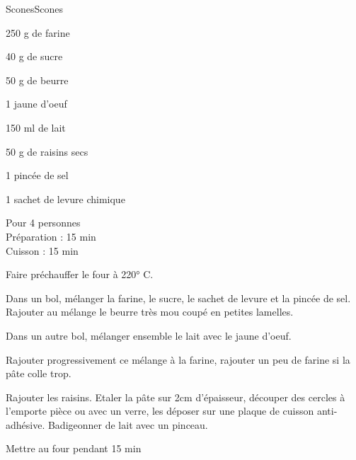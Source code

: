 \begin{recette}{Scones}{Scones}

\begin{ingredients}
250 g de farine\par
40 g de sucre\par
50 g de beurre\par
1 jaune d'oeuf\par
150 ml de lait\par
50 g de raisins secs\par
1 pincée de sel\par
1 sachet de levure chimique\par
\end{ingredients}

\begin{infos}
Pour 4 personnes\\
Préparation : 15 min\\
Cuisson : 15 min\\
\end{infos}

\begin{etapes}
\item Faire préchauffer le four à 220° C.
\item Dans un bol, mélanger la farine, le sucre, le sachet de levure et la pincée de sel. Rajouter au mélange le beurre très mou coupé en petites lamelles.
\item Dans un autre bol, mélanger ensemble le lait avec le jaune d'oeuf.
\item Rajouter progressivement ce mélange à la farine, rajouter un peu de farine si la pâte colle trop.
\item Rajouter les raisins. Etaler la pâte sur 2cm d'épaisseur, découper des cercles à l'emporte pièce ou avec un verre, les déposer sur une plaque de cuisson anti-adhésive. Badigeonner de lait avec un pinceau.
\item Mettre au four pendant 15 min
\end{etapes}

\end{recette}